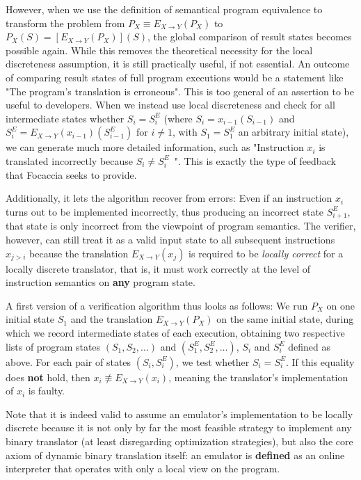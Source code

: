 However, when we use the definition of semantical program equivalence to transform the problem from $P_X \equiv E_{X
\rightarrow Y}(P_X)$ to $P_X(S) = [E_{X \rightarrow Y}(P_X)](S)$, the global comparison of result states becomes
possible again.  While this removes the theoretical necessity for the local discreteness assumption, it is still
practically useful, if not essential. An outcome of comparing result states of full program executions would be a
statement like "The program's translation is erroneous". This is too general of an assertion to be useful to developers.
When we instead use local discreteness and check for all intermediate states whether $S_i = S^E_i$ (where $S_i =
x_{i-1}(S_{i-1})$ and $S^E_i = E_{X \rightarrow Y}(x_{i-1})(S^E_{i-1})$ for $i \neq 1$, with $S_1 = S^E_1$ an arbitrary
initial state), we can generate much more detailed information, such as "Instruction $x_i$ is translated incorrectly
because $S_i \neq S^E_i$~". This is exactly the type of feedback that Focaccia seeks to provide.

Additionally, it lets the algorithm recover from errors: Even if an instruction $x_i$ turns out to be implemented
incorrectly, thus producing an incorrect state $S^E_{i+1}$, that state is only incorrect from the viewpoint of program
semantics. The verifier, however, can still treat it as a valid input state to all subsequent instructions $x_{j > i}$
because the translation $E_{X \rightarrow Y}(x_j)$ is required to be \textit{locally correct} for a locally discrete
translator, that is, it must work correctly at the level of instruction semantics on \textbf{any} program state.

A first version of a verification algorithm thus looks as follows: We run $P_X$ on one initial state $S_1$ and the
translation $E_{X \rightarrow Y}(P_X)$ on the same initial state, during which we record intermediate states of each
execution, obtaining two respective lists of program states $(S_1, S_2, …)$ and $(S^E_1, S^E_2, …)$, $S_i$ and $S^E_i$
defined as above. For each pair of states $(S_i, S^E_i)$, we test whether $S_i = S^E_i$. If this equality does
\textbf{not} hold, then $x_i \not\equiv E_{X \rightarrow Y}(x_i)$, meaning the translator's implementation of $x_i$ is
faulty.

Note that it is indeed valid to assume an emulator's implementation to be locally discrete because it is not only by far
the most feasible strategy to implement any binary translator (at least disregarding optimization strategies), but also
the core axiom of dynamic binary translation itself: an emulator is \textbf{defined} as an online interpreter that
operates with only a local view on the program.

